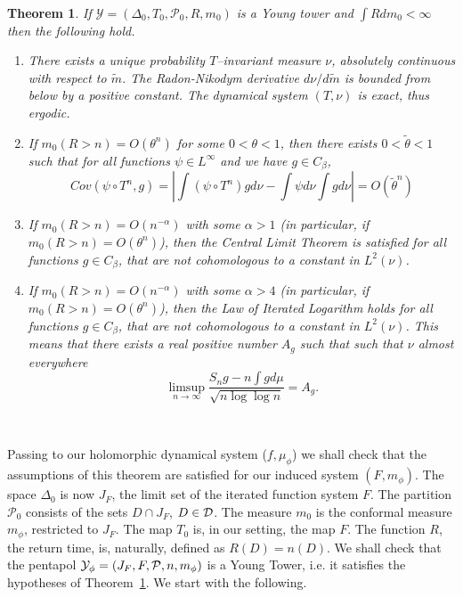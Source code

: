 \documentclass[12pt]{amsart}
\numberwithin{equation}{section}
\newcommand{\nl}{\newline}
\newtheorem{thm}{Theorem}[section]
\def\De{\Delta}               \def\e{\varepsilon}          \def\f{\phi}
\def\lt{\left}                \def\rt{\right}
\def\sp{\medskip}             \def\fr{\noindent}        \def\nl{\newline}
\begin{document}
\

\begin{thm}\label{lsyoung0}
If $\mathcal{Y}=(\De_0,T_0,\mathcal{P}_0,R,m_0)$ is a Young tower and
$\int R dm_0<\infty$ then the following hold.

\sp\begin{enumerate}
\item{} There exists a unique probability  
$T$--invariant measure $\nu$, absolutely continuous with respect to
$\tilde m$. The Radon-Nikodym derivative $d\nu/d\tilde m$ is bounded
from below by a positive constant. The dynamical system $(T,\nu)$ is
exact, thus ergodic. 
\sp\item{} If $m_0(R>n)=O(\theta^n)$ for some $0<\theta<1$, then there
exists $0<\tilde\theta<1$ such that for all functions $\psi\in
L^\infty$ and we have $ g\in C_\beta$,  
\begin{equation}\label{cov}
Cov(\psi\circ T^n, g)
=\lt|\int (\psi\circ T^n) g d\nu-\int\psi d\nu\int g d\nu\rt|
=O(\tilde\theta^n) 
\end{equation}
\item{} If $m_0(R>n)=O(n^{-\alpha})$ with some $\alpha>1$ (in
  particular, if $m_0(R>n)=O(\theta^n)$), then  the Central Limit
  Theorem is satisfied for all functions $ g\in C_\beta$, that
  are not cohomologous to a constant in $L^2(\nu)$. 

\sp\item{} If $m_0(R>n)=O(n^{-\alpha})$ with some $\alpha>4$ (in
  particular, if $m_0(R>n)=O(\theta^n)$), then the Law of
  Iterated Logarithm holds for all functions $ g\in C_\beta$, that
  are not cohomologous to a constant in $L^2(\nu)$. This means that
  there exists a real positive number $A_g$  such that such that
  $\nu$ almost everywhere  
$$
\limsup_{n\to\infty}\frac{S_{n}g-n\int gd\mu}{\sqrt{n\log\log n}}=A_g. 
$$
\end{enumerate}
\end{thm}

\

\fr Passing to our holomorphic dynamical system ($f,\mu_\phi$) we
shall check that the assumptions of this  theorem are 
satisfied for our induced system $(F,m_\phi)$.    
The space $\Delta_0$ is now $J_F$, the limit set of the iterated
function system $F$. The partition $\mathcal{P}_0$ consists of the
sets $D\cap J_F$, $D\in\mathcal D$. The measure $m_0$ is the
conformal measure $m_\phi$, restricted to $J_F$.  
The map $T_0$ is, in our setting, the map $F$. The function $R$, the
return time, is, naturally, defined as $R(D)=n(D)$. We shall check
that the pentapol $\mathcal Y_\phi=(J_F,F,{\mathcal P},n,m_\phi)$ is a Young
Tower, i.e. it satisfies the hypotheses of Theorem~\ref{lsyoung0}. We
start with the following. 
\end{document}
